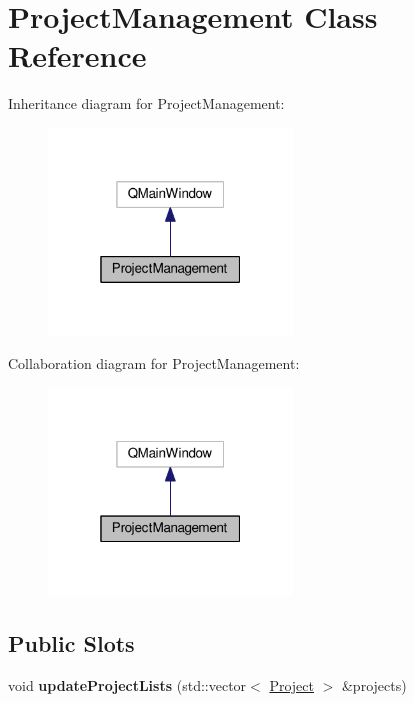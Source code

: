 \hypertarget{class_project_management}{}\section{Project\+Management Class Reference}
\label{class_project_management}


Inheritance diagram for Project\+Management\+:
\nopagebreak
\begin{figure}[H]
\begin{center}
\leavevmode
\includegraphics[width=184pt]{class_project_management__inherit__graph}
\end{center}
\end{figure}


Collaboration diagram for Project\+Management\+:
\nopagebreak
\begin{figure}[H]
\begin{center}
\leavevmode
\includegraphics[width=184pt]{class_project_management__coll__graph}
\end{center}
\end{figure}
\subsection*{Public Slots}
\begin{DoxyCompactItemize}
\item 
void {\bfseries update\+Project\+Lists} (std\+::vector$<$ \hyperlink{struct_project}{Project} $>$ \&projects)\hypertarget{class_project_management_a80660d76ef6c48038d43935e1a9a2e39}{}\label{class_project_management_a80660d76ef6c48038d43935e1a9a2e39}

\end{DoxyCompactItemize}
